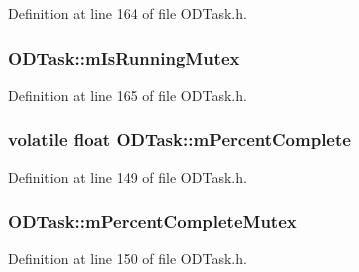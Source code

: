 Definition at line 164 of file O\+D\+Task.\+h.

\subsubsection[{\texorpdfstring{m\+Is\+Running\+Mutex}{mIsRunningMutex}}]{ O\+D\+Task\+::m\+Is\+Running\+Mutex\hspace{0.3cm}{\ttfamily [protected]}}\hypertarget{class_o_d_task_a56765162fb9180721fddf08e8993e9ec}{}\label{class_o_d_task_a56765162fb9180721fddf08e8993e9ec}


Definition at line 165 of file O\+D\+Task.\+h.

\subsubsection[{\texorpdfstring{m\+Percent\+Complete}{mPercentComplete}}]{\setlength{\rightskip}{0pt plus 5cm}volatile float O\+D\+Task\+::m\+Percent\+Complete\hspace{0.3cm}{\ttfamily [protected]}}\hypertarget{class_o_d_task_a81842f8c6d99d72ce3cd215c113a261d}{}\label{class_o_d_task_a81842f8c6d99d72ce3cd215c113a261d}


Definition at line 149 of file O\+D\+Task.\+h.

\subsubsection[{\texorpdfstring{m\+Percent\+Complete\+Mutex}{mPercentCompleteMutex}}]{ O\+D\+Task\+::m\+Percent\+Complete\+Mutex\hspace{0.3cm}{\ttfamily [protected]}}\hypertarget{class_o_d_task_add5ff78b44107292569dfdeeb90c8118}{}\label{class_o_d_task_add5ff78b44107292569dfdeeb90c8118}


Definition at line 150 of file O\+D\+Task.\+h.

